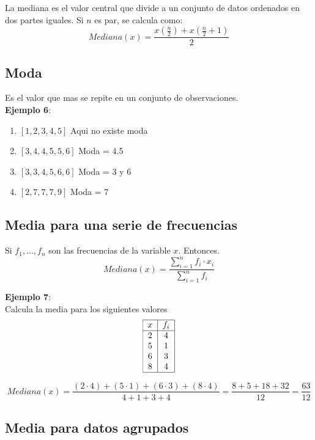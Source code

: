 \documentclass[11pt, a4paper]{report}
\begin{document}
La mediana es el valor central que divide a un conjunto de datos ordenados en dos partes iguales. Si $n$ es par, se calcula como:
\[
    Mediana(x) = \frac{x(\frac{n}{2}) + x(\frac{n}{2} + 1)}{2}
\]


\subsection{Moda}

Es el valor que mas se repite en un conjunto  de observaciones. \\
\textbf{Ejemplo 6}:

\begin{enumerate}
    \item $[1,2,3,4,5]$ Aqui no existe moda
    \item $[3,4,4,5,5,6]$ Moda = 4.5
    \item $[3,3,4,5,6,6]$ Moda = 3 y 6
    \item $[2,7,7,7,9]$ Moda = 7
\end{enumerate}

\subsection{Media para una serie de frecuencias}

Si $f_1, ... , f_n$ son las frecuencias de la variable $x$. Entonces.
\[
    Mediana(x) = \frac{\sum^{n}_{i=1}f_i \cdot x_i}{\sum^{n}_{i=1}f_i}
\]


\textbf{Ejemplo 7}: \\
Calcula la media para los siguientes valores
\[
    \begin{tabular}{|c|c|}
        \hline
        $x$ & $f_i$ \\
        \hline
        2   & 4     \\
        5   & 1     \\
        6   & 3     \\
        8   & 4     \\
        \hline
    \end{tabular}
\]

\[
    Mediana(x) = \frac{(2\cdot4) + (5\cdot1) + (6\cdot3) + (8\cdot4)}{4+1+3+4} = \frac{8+5+18+32}{12} = \frac{63}{12}
\]

\subsection{Media para datos agrupados}
\end{document}
